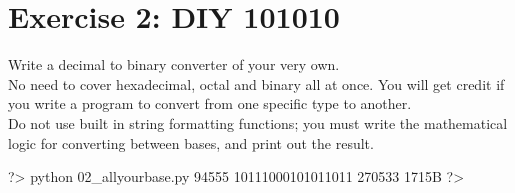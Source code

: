 \documentclass{42-en}
\begin{document}
\chapter{Exercise 2: DIY 101010}
\makeheaderfiles

Write a decimal to binary converter of your very own.\\

No need to cover hexadecimal, octal and binary all at once. You will get credit if you write a program to convert from one specific type to another.\\

Do not use built in string formatting functions; you must write the mathematical logic for converting between bases, and print out the result.\\

\begin{42console}
	?> python 02_allyourbase.py 94555
	10111000101011011
	270533
	1715B
	?>
\end{42console}
\end{document}
